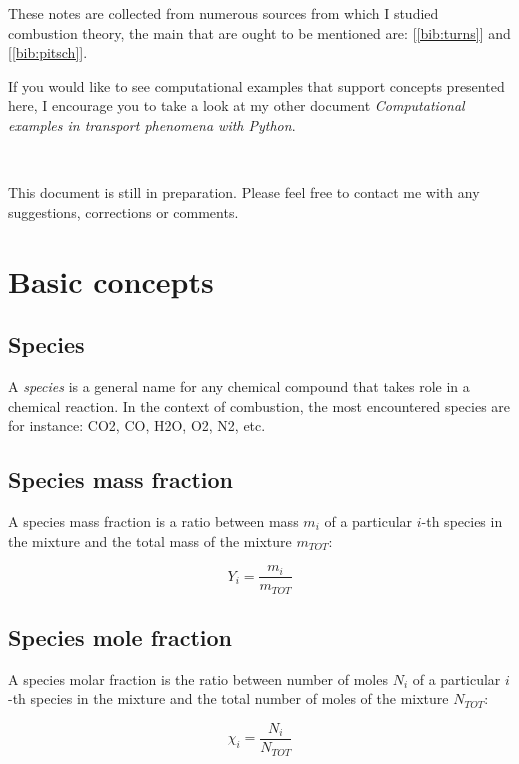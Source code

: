 \documentclass[10pt,twocolumn]{article}
\begin{document}
These notes are collected from numerous sources from which I studied combustion theory, the main that are ought to be mentioned are: [\ref{bib:turns}] and [\ref{bib:pitsch}].

If you would like to see computational examples that support concepts presented here, I encourage you to take a look at my other document \textit{Computational examples in transport phenomena with Python}.

\,\,

This document is still in preparation. Please feel free to contact me with any suggestions, corrections or comments.

\tableofcontents

\section{Basic concepts}

\subsection{Species}

A \textit{species} is a general name for any chemical compound that takes role in a chemical reaction. In the context of combustion, the most encountered species are for instance: CO2, CO, H2O, O2, N2, etc.

\subsection{Species mass fraction}

A species mass fraction is a ratio between mass $m_i$ of a particular $i$-th species in the mixture and the total mass of the mixture $m_{TOT}$:

\begin{equation}
Y_i = \frac{m_i}{m_{TOT}}
\end{equation}

\subsection{Species mole fraction}

A species molar fraction is the ratio between number of moles $N_i$ of a particular $i$-th species in the mixture and the total number of moles of the mixture $N_{TOT}$:

\begin{equation}
\chi_i = \frac{N_i}{N_{TOT}}
\end{equation}
\end{document}
